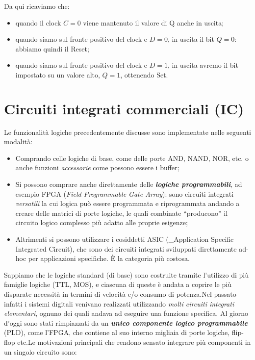 \documentclass[
]{book}
\providecommand{\tightlist}{%
  \setlength{\itemsep}{0pt}\setlength{\parskip}{0pt}}
\begin{document}
Da qui ricaviamo che:

\begin{itemize}
\tightlist
\item
  quando il clock \(C=0\) viene mantenuto il valore di Q anche in
  uscita;
\item
  quando siamo sul fronte positivo del clock e \(D=0\), in uscita il bit
  \(Q=0\): abbiamo quindi il Reset;
\item
  quando siamo sul fronte positivo del clock e \(D=1\), in uscita avremo
  il bit impostato su un valore alto, \(Q=1\), ottenendo Set.
\end{itemize}

\chapter{Circuiti integrati commerciali
(IC)}\label{circuiti-integrati-commerciali-ic}

Le funzionalità logiche precedentemente discusse sono implementate nelle
seguenti modalità:

\begin{itemize}
\tightlist
\item
  Comprando celle logiche di base, come delle porte AND, NAND, NOR, etc.
  o anche funzioni \emph{accessorie} come possono essere i buffer;
\item
  Si possono comprare anche direttamente delle \textbf{\emph{logiche
  programmabili}}, ad esempio FPGA (\emph{Field Programmable Gate
  Array}): sono circuiti integrati \emph{versatili} la cui logica può
  essere programmata e riprogrammata andando a creare delle matrici di
  porte logiche, le quali combinate ``producono'' il circuito logico
  complesso più adatto alle proprie esigenze;
\item
  Altrimenti si possono utilizzare i cosiddetti ASIC (\_Application
  Specific Integrated Circuit), che sono dei circuiti integrati
  sviluppati direttamente ad-hoc per applicazioni specifiche. È la
  categoria più costosa.
\end{itemize}

Sappiamo che le logiche standard (di base) sono costruite tramite
l'utilizzo di più famiglie logiche (TTL, MOS), e ciascuna di queste è
andata a coprire le più disparate necessità in termini di velocità e/o
consumo di potenza.\newline Nel passato infatti i sistemi digitali
venivano realizzati utilizzando \emph{molti circuiti integrati
elementari}, ognuno dei quali andava ad eseguire una funzione specifica.
Al giorno d'oggi sono stati rimpiazzati da un \textbf{\emph{unico
componente logico programmabile}} (PLD), come l'FPGA, che contiene al
suo interno migliaia di porte logiche, flip-flop etc.\newline Le
motivazioni principali che rendono sensato integrare più componenti in
un singolo circuito sono:
\end{document}
